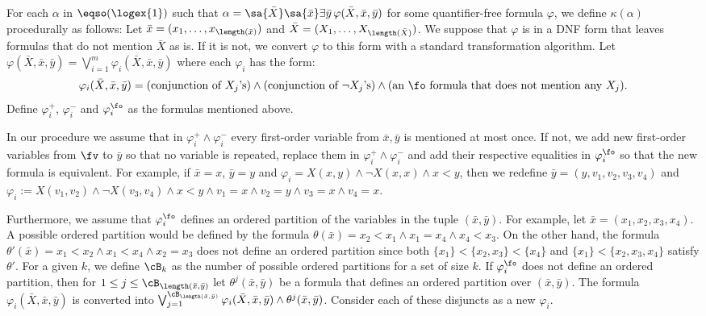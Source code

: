 \vspace{1em}

For each $\alpha$ in $\eqso(\logex{1})$ such that $\alpha = \sa{\bar{X}}\sa{\bar{x}}\exists\bar{y}\,\varphi(\bar{X},\bar{x},\bar{y})$ for some quantifier-free formula $\varphi$, we define $\kappa(\alpha)$ procedurally as follows: Let $\bar{x} = (x_1,\ldots,x_{\length(\bar{x})})$ and $\bar{X} = (X_1,\ldots,X_{\length(\bar{X})})$. We suppose that $\varphi$ is in a DNF form that leaves formulas that do not mention $\bar{X}$ as is. If it is not, we convert $\varphi$ to this form with a standard transformation algorithm. Let $\varphi(\bar{X},\bar{x},\bar{y}) = \bigvee_{i = 1}^m\varphi_i(\bar{X},\bar{x},\bar{y})$ where each $\varphi_i$ has the form:
$$
\varphi_i(\bar{X},\bar{x},\bar{y}) = (\text{conjunction of $X_j$'s}) \wedge (\text{conjunction of $\neg X_j$'s})  \wedge (\text{an $\fo$ formula that does not mention any $X_j$}).
$$
Define $\varphi_i^{+}$, $\varphi_i^{-}$ and $\varphi_i^{\fo}$ as the formulas mentioned above. 

In our procedure we assume that in $\varphi_i^{+}\wedge\varphi_i^{-}$ every first-order variable from $\bar{x},\bar{y}$ is mentioned at most once. If not, we add new first-order variables from $\fv$ to $\bar{y}$ so that no variable is repeated, replace them in $\varphi_i^{+}\wedge\varphi_i^{-}$ and add their respective equalities in $\varphi_i^{\fo}$ so that the new formula is equivalent. For example, if $\bar{x} = x$, $\bar{y} = y$ and $\varphi_i = X(x,y)\wedge \neg X(x,x) \wedge x < y$, then we redefine $\bar{y} = (y,v_1,v_2,v_3,v_4)$ and $\varphi_i := X(v_1,v_2) \wedge \neg X(v_3,v_4) \wedge x < y \wedge v_1 = x \wedge v_2 = y \wedge v_3 = x \wedge v_4 = x.$ 

Furthermore, we assume that $\varphi_i^{\fo}$ defines an ordered partition of the variables in the tuple $(\bar{x},\bar{y})$. For example, let $\bar{x} = (x_1,x_2,x_3,x_4)$. A possible ordered partition would be defined by the formula $\theta(\bar{x}) = x_2 < x_1 \wedge x_1 = x_4 \wedge x_4 < x_3$. On the other hand, the formula $\theta'(\bar{x}) = x_1 < x_2 \wedge x_1 < x_4 \wedge x_2 = x_3$ does not define an ordered partition since both $\{x_1\}<\{x_2,x_3\}<\{x_4\}$ and $\{x_1\} < \{x_2,x_3,x_4\}$ satisfy $\theta'$.
For a given $k$, we define $\cB_k$ as the number of possible ordered partitions for a set of size $k$. 
If $\varphi_i^{\fo}$ does not define an ordered partition, then for $1 \leq j \leq \cB_{\length(\bar{x},\bar{y})}$ 
let $\theta^j(\bar{x},\bar{y})$ be a formula that defines an ordered partition over $(\bar{x},\bar{y})$. The formula $\varphi_i(\bar{X},\bar{x},\bar{y})$ is converted into $\bigvee_{j = 1}^{\cB_{\length(\bar{x},\bar{y})}}\varphi_i(\bar{X},\bar{x},\bar{y}) \wedge \theta^j(\bar{x},\bar{y})$. Consider each of these disjuncts as a new $\varphi_i$.

